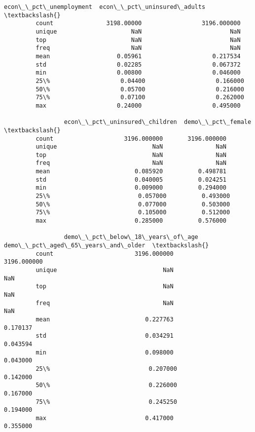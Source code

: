 \documentclass[11pt]{article}
\begin{document}
\begin{Verbatim}[commandchars=\\\{\}]
                 econ\_\_pct\_unemployment  econ\_\_pct\_uninsured\_adults  \textbackslash{}
         count               3198.00000                 3196.000000   
         unique                     NaN                         NaN   
         top                        NaN                         NaN   
         freq                       NaN                         NaN   
         mean                   0.05961                    0.217534   
         std                    0.02285                    0.067372   
         min                    0.00800                    0.046000   
         25\%                    0.04400                    0.166000   
         50\%                    0.05700                    0.216000   
         75\%                    0.07100                    0.262000   
         max                    0.24000                    0.495000   
         
                 econ\_\_pct\_uninsured\_children  demo\_\_pct\_female  \textbackslash{}
         count                    3196.000000       3196.000000   
         unique                           NaN               NaN   
         top                              NaN               NaN   
         freq                             NaN               NaN   
         mean                        0.085920          0.498781   
         std                         0.040005          0.024251   
         min                         0.009000          0.294000   
         25\%                         0.057000          0.493000   
         50\%                         0.077000          0.503000   
         75\%                         0.105000          0.512000   
         max                         0.285000          0.576000   
         
                 demo\_\_pct\_below\_18\_years\_of\_age  demo\_\_pct\_aged\_65\_years\_and\_older  \textbackslash{}
         count                       3196.000000                        3196.000000   
         unique                              NaN                                NaN   
         top                                 NaN                                NaN   
         freq                                NaN                                NaN   
         mean                           0.227763                           0.170137   
         std                            0.034291                           0.043594   
         min                            0.098000                           0.043000   
         25\%                            0.207000                           0.142000   
         50\%                            0.226000                           0.167000   
         75\%                            0.245250                           0.194000   
         max                            0.417000                           0.355000   
         

\end{Verbatim}
\end{document}

